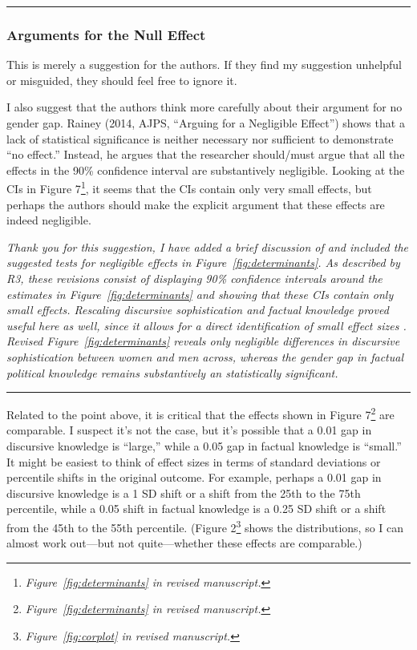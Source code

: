
\rule{\linewidth}{.01cm}

\subsubsection*{Arguments for the Null Effect}

This is merely a suggestion for the authors. If they find my suggestion unhelpful or misguided, they should feel free to ignore it.

I also suggest that the authors think more carefully about their argument for no gender gap. Rainey (2014, AJPS, ``Arguing for a Negligible Effect'') shows that a lack of statistical significance is neither necessary nor sufficient to demonstrate ``no effect.'' Instead, he argues that the researcher should/must argue that all the effects in the 90\% confidence interval are substantively negligible. Looking at the CIs in Figure 7\footnote{\textit{Figure~\ref{fig:determinants} in revised manuscript.}}, it seems that the CIs contain only very small effects, but perhaps the authors should make the explicit argument that these effects are indeed negligible.

\textit{Thank you for this suggestion, I have added a brief discussion of \citep{rainey2014arguing} and included the suggested tests for negligible effects in Figure~\ref{fig:determinants}. As described by R3, these revisions consist of displaying 90\% confidence intervals around the estimates in Figure~\ref{fig:determinants} and showing that these CIs contain only small effects. Rescaling discursive sophistication and factual knowledge proved useful here as well, since it allows for a direct identification of small effect sizes \citep[equivalent to Cohen's $d \leq 0.2$; see][]{sawilowsky2009new}. Revised Figure~\ref{fig:determinants} reveals only negligible differences in discursive sophistication between women and men across, whereas the gender gap in factual political knowledge remains substantively an statistically significant.}


\rule{\linewidth}{.01cm}

Related to the point above, it is critical that the effects shown in Figure 7\footnote{\textit{Figure~\ref{fig:determinants} in revised manuscript.}} are comparable. I suspect it’s not the case, but it’s possible that a 0.01 gap in discursive knowledge is ``large,'' while a 0.05 gap in factual knowledge is ``small.'' It might be easiest to think of effect sizes in terms of standard deviations or percentile shifts in the original outcome. For example, perhaps a 0.01 gap in discursive knowledge is a 1 SD shift or a shift from the 25th to the 75th percentile, while a 0.05 shift in factual knowledge is a 0.25 SD shift or a shift from the 45th to the 55th percentile. (Figure 2\footnote{\textit{Figure~\ref{fig:corplot} in revised manuscript.}} shows the distributions, so I can almost work out—but not quite—whether these effects are comparable.)

